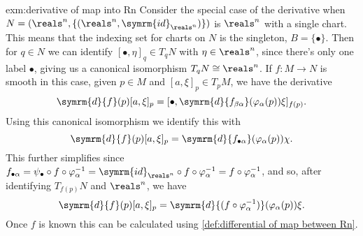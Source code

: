 \documentclass[fleqn]{NotesClass}
\renewcommand{\dl}{\symrm{d}}
\newcommand{\id}{\symrm{id}}
\newcommand{\isomorphic}{\cong}
\begin{document}
    \begin{exm}{}{exm:derivative of map into Rn}
        Consider the special case of the derivative when \(N = (\reals^n, \{(\reals^n, \id_{\reals^n})\})\) is \(\reals^n\) with a single chart.
        This means that the indexing set for charts on \(N\) is the singleton, \(B = \{\bullet\}\).
        Then for \(q \in N\) we can identify \([\bullet, \eta]_q \in T_qN\) with \(\eta \in \reals^n\), since there's only one label \(\bullet\), giving us a canonical isomorphism \(T_qN \isomorphic \reals^n\).
        If \(f \colon M \to N\) is smooth in this case, given \(p \in M\) and \([a, \xi]_p \in T_pM\), we have the derivative
        \begin{equation}
            \dl{f}(p)[a, \xi]_p = [\bullet, \dl{f_{\beta\alpha}}(\varphi_\alpha(p))\xi]_{f(p)}.
        \end{equation}
        Using this canonical isomorphism we identify this with
        \begin{equation}
            \dl{f}(p)[a, \xi]_p = \dl{f_{\bullet\alpha}}(\varphi_\alpha(p))\chi.
        \end{equation}
        This further simplifies since \(f_{\bullet\alpha} = \psi_\bullet \circ f \circ \varphi_\alpha^{-1} = \id_{\reals^n} \circ f \circ \varphi_\alpha^{-1} = f \circ \varphi_\alpha^{-1}\), and so, after identifying \(T_{f(p)}N\) and \(\reals^n\), we have
        \begin{equation}
            \dl{f}(p)[a, \xi]_p = \dl{(f \circ \varphi_\alpha^{-1})}(\varphi_\alpha(p))\xi.
        \end{equation}
        Once \(f\) is known this can be calculated using \cref{def:differential of map between Rn}.
    \end{exm}
\end{document}
